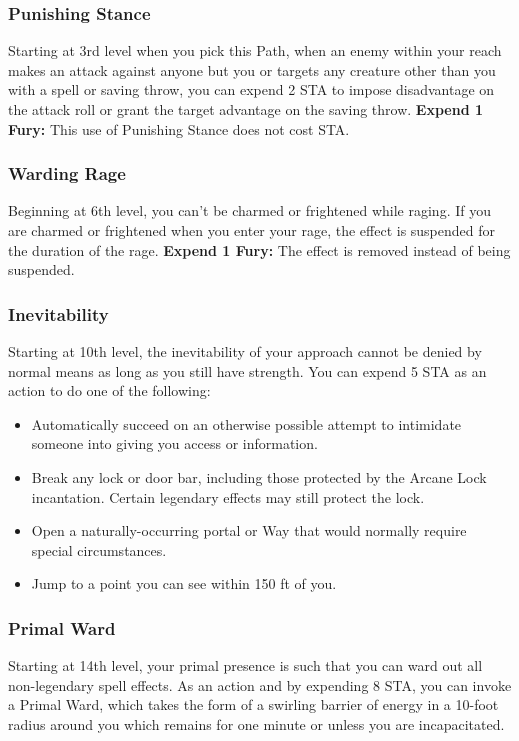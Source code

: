 \subsubsection{Punishing Stance}

Starting at 3rd level when you pick this Path, when an enemy within your reach makes an attack against anyone but you or targets any creature other than you with a spell or saving throw, you can expend 2 STA to impose disadvantage on the attack roll or grant the target advantage on the saving throw. \textbf{Expend 1 Fury:} This use of Punishing Stance does not cost STA.

\subsubsection{Warding Rage}

Beginning at 6th level, you can't be charmed or frightened while raging. If you are charmed or frightened when you enter your rage, the effect is suspended for the duration of the rage. \textbf{Expend 1 Fury:} The effect is removed instead of being suspended.

\subsubsection{Inevitability}

Starting at 10th level, the inevitability of your approach cannot be denied by normal means as long as you still have strength. You can expend 5 STA as an action to do one of the following:
\begin{itemize}
\item  Automatically succeed on an otherwise possible attempt to intimidate someone into giving you access or information.
\item  Break any lock or door bar, including those protected by the Arcane Lock incantation. Certain legendary effects may still protect the lock.
\item  Open a naturally-occurring portal or Way that would normally require special circumstances.
\item  Jump to a point you can see within 150 ft of you.
\end{itemize}

\subsubsection{Primal Ward}

Starting at 14th level, your primal presence is such that you can ward out all non-legendary spell effects. As an action and by expending 8 STA, you can invoke a Primal Ward, which takes the form of a swirling barrier of energy in a 10-foot radius around you which remains for one minute or unless you are incapacitated.

